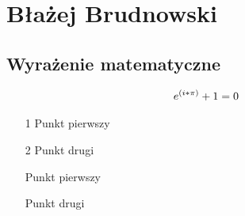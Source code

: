 \section{Błażej Brudnowski}
\subsection{Wyrażenie matematyczne}

\begin{align}
{e^{(i * \pi)} + 1 = 0}
\pagenumbering{gobble}
\end{align}


\begin{itemize}
\subsection{Itemy}
\item[1]{Punkt pierwszy}
\item[2]{Punkt drugi}
\end{itemize}


\begin{itemize}
\subsection{Itemy}
\item[]{Punkt pierwszy}
\item[]{Punkt drugi}
\end{itemize}


